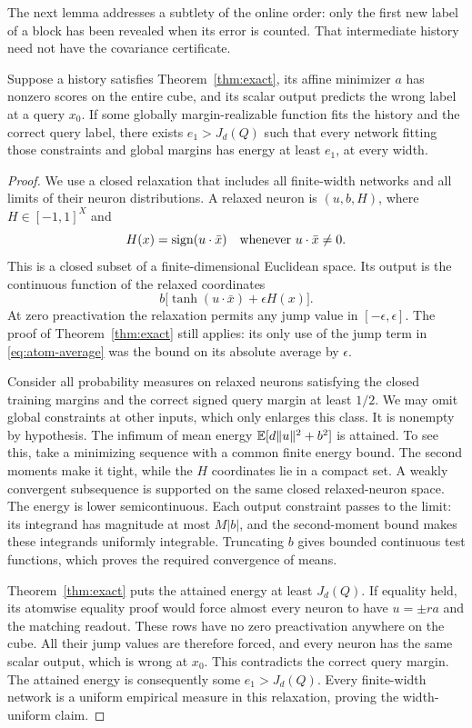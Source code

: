 The next lemma addresses a subtlety of the online order: only the first
new label of a block has been revealed when its error is counted.
That intermediate history need not have the covariance certificate.

\begin{lemma}\label{lem:uniform-gap}
Suppose a history satisfies Theorem~\ref{thm:exact}, its affine
minimizer $a$ has nonzero scores on the entire cube, and its scalar
output predicts the wrong label at a query $x_0$. If some globally
margin-realizable function fits the history and the correct query
label, there exists $e_1>J_d(Q)$ such that every network fitting those
constraints and global margins has energy at least $e_1$, at every
width.
\end{lemma}

\begin{proof}
We use a closed relaxation that includes all finite-width networks and
all limits of their neuron distributions. A relaxed neuron is
$(u,b,H)$, where $H\in[-1,1]^X$ and
\[
 H(x)=\operatorname{sign}(u\cdot\bar x)\quad\text{whenever }u\cdot\bar x\ne0.
\]
This is a closed subset of a finite-dimensional Euclidean space.
Its output is the continuous function of the relaxed coordinates
\[
 b\bigl[\tanh(u\cdot\bar x)+\epsilon H(x)\bigr].
\]
At zero preactivation the relaxation permits any jump value in
$[-\epsilon,\epsilon]$. The proof of Theorem~\ref{thm:exact} still
applies: its only use of the jump term in \eqref{eq:atom-average} was
the bound on its absolute average by $\epsilon$.

Consider all probability measures on relaxed neurons satisfying the
closed training margins and the correct signed query margin at least
$1/2$. We may omit global constraints at other inputs, which only
enlarges this class. It is nonempty by hypothesis. The infimum of
mean energy $\mathbb E[d\|u\|^2+b^2]$ is attained. To see this, take a
minimizing sequence with a common finite energy bound. The second
moments make it tight, while the $H$ coordinates lie in a compact set.
A weakly convergent subsequence is supported on the same closed
relaxed-neuron space. The energy is lower semicontinuous. Each output
constraint passes to the limit: its integrand has magnitude at most
$M|b|$, and the second-moment bound makes these integrands uniformly
integrable. Truncating $b$ gives bounded continuous test functions,
which proves the required convergence of means.

Theorem~\ref{thm:exact} puts the attained energy at least $J_d(Q)$.
If equality held, its atomwise equality proof would force almost every
neuron to have $u=\pm ra$ and the matching readout. These rows have no
zero preactivation anywhere on the cube. All their jump values are
therefore forced, and every neuron has the same scalar output, which
is wrong at $x_0$. This contradicts the correct query margin. The
attained energy is consequently some $e_1>J_d(Q)$. Every finite-width
network is a uniform empirical measure in this relaxation, proving the
width-uniform claim.
\end{proof}
